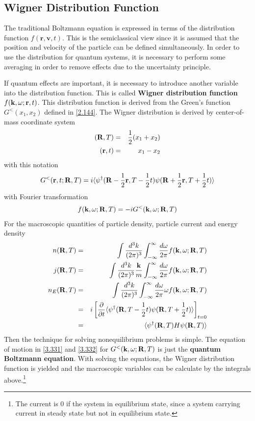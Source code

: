 \subsection{Wigner Distribution Function}
The traditional Boltzmann equation is expressed in terms of the distribution function $f(\mathbf{r},\mathbf{v},t)$.
This is the semiclassical view since it is assumed that the position and velocity of the particle can be defined simultaneously.
In order to use the distribution for quantum systems, it is necessary  to perform some averaging in order to remove effects due to the uncertainty principle.

If quantum effects are important, it is necessary to introduce another variable into the distribution function.
This is called \textbf{Wigner distribution function} $f(\mathbf{k},\omega;\mathbf{r},t)$.
This distribution function is derived from the Green's function $G^<(x_1,x_2)$ defined in \eqref{2.144}.
The Wigner distribution is derived by center-of-mass coordinate system
\begin{eqnarray}
    (\mathbf{R},T) &=& \frac{1}{2} (x_1+x_2)  \label{3.333} \\
    (\mathbf{r},t) &=& x_1 -x_2 \label{3.334}
\end{eqnarray}
with this notation
\begin{equation}
    G^<(\mathbf{r},t; \mathbf{R},T) = i \langle \psi^\dagger(\mathbf{R}- \frac{1}{2} \mathbf{r}, T- \frac{1}{2} t) \psi(\mathbf{R}+ \frac{1}{2} \mathbf{r},T + \frac{1}{2} t) \rangle      \label{3.335}
\end{equation}
with Fourier transformation
\begin{equation}
    f(\mathbf{k},\omega;\mathbf{R},T) = -i G^<(\mathbf{k},\omega;\mathbf{R},T)       \label{3.337}
\end{equation}
For the macroscopic quantities of particle density, particle current and energy density
\begin{eqnarray}
    n(\mathbf{R},T) &=& \int \frac{d^3 k}{(2\pi)^3} \int_{-\infty}^\infty \frac{d\omega}{2\pi}  f(\mathbf{k},\omega;\mathbf{R},T) \\
    j(\mathbf{R},T) &=& \int \frac{d^3 k}{(2\pi)^3} \frac{\mathbf{k}}{m} \int_{-\infty}^\infty \frac{d\omega}{2\pi}  f(\mathbf{k},\omega;\mathbf{R},T) \label{3.338} \\
 n_E(\mathbf{R},T) &=& \int \frac{d^3 k}{(2\pi)^3} \int_{-\infty}^\infty \frac{d\omega}{2\pi} \omega f(\mathbf{k},\omega;\mathbf{R},T) \nonumber \\
    &=&i\left[ \frac{\partial}{\partial t} \langle \psi^\dagger(\mathbf{R},T- \frac{1}{2} t) \psi(\mathbf{R},T+ \frac{1}{2} t) \rangle \right]_{t=0} \nonumber \\
    &=& \langle \psi^\dagger(\mathbf{R},T) H \psi(\mathbf{R},T) \rangle     \label{3.339}
\end{eqnarray}
Then the technique for solving nonequilibrium problems is simple.
The equation of motion in \ref{3.331} and \ref{3.332} for $G^<(\mathbf{k},\omega;\mathbf{R},T)$ is just the \textbf{quantum Boltzmann equation}.
With solving the equations, the Wigner distribution function is yielded and the macroscopic variables can be calculate by the integrals above.\footnote{The current is 0 if the system in equilibrium state, since a system carrying current in steady state but not in equilibrium state.}

